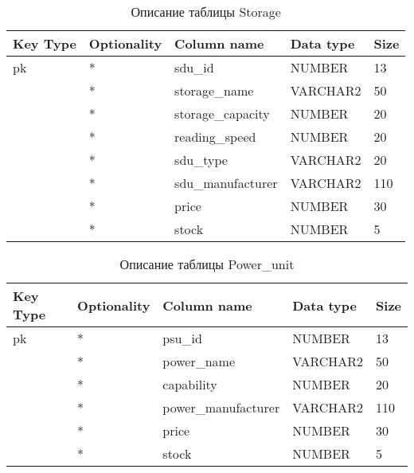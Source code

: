 \begin{xltabular}{\textwidth}{|X|X|p{4.0cm}|X|X|}
	\caption{Описание таблицы Storage\label{tab:storage}}\\
	\hline
	Key Type & Optionality & Column name & Data type & Size \\ \hline
	pk & * & sdu\_id & NUMBER & 13 \\ \hline
	& * & storage\_name & VARCHAR2 & 50 \\ \hline
	& * & storage\_capacity & NUMBER & 20 \\ \hline
	& * & reading\_speed & NUMBER & 20 \\ \hline
	& * & sdu\_type & VARCHAR2 & 20 \\ \hline
	& * & sdu\_manufacturer & VARCHAR2 & 110 \\ \hline
	& * & price & NUMBER & 30 \\ \hline
	& * & stock & NUMBER & 5 \\ \hline
\end{xltabular}

\newpage

\begin{xltabular}{\textwidth}{|X|X|p{4.0cm}|X|X|}
	\caption{Описание таблицы Power\_unit\label{tab:psu}}\\
	\hline
	Key Type & Optionality & Column name & Data type & Size \\ \hline
	pk & * & psu\_id & NUMBER & 13 \\ \hline
	& * & power\_name & VARCHAR2 & 50 \\ \hline
	& * & capability & NUMBER & 20 \\ \hline
	& * & power\_manufacturer & VARCHAR2 & 110 \\ \hline
	& * & price & NUMBER & 30 \\ \hline
	& * & stock & NUMBER & 5 \\ \hline
\end{xltabular}


